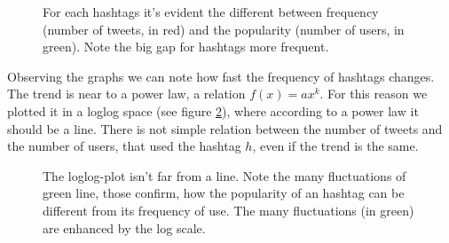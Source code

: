 \documentclass[a4paper,11pt,oneside]{article}
\begin{document}
\begin{figure}[h]
\centering
{}
\caption{For each hashtags it's evident the different between frequency (number of tweets, in red) and the popularity (number of users, in green). Note the big gap for hashtags more frequent.}
\label{fig:plotFrequency}
\end{figure}

Observing the graphs we can note how fast the frequency of hashtags changes. The trend is near to a power law, a relation $f(x) = ax^k$. For this reason we plotted it in a loglog space (see figure \ref{fig:loglogPlot}), where according to a power law it should be a line.
There is not simple relation between the number of tweets and the number of users, that used the hashtag $h$, even if the trend is the same.

\begin{figure}[h]
\centering
{}
\caption{The loglog-plot isn't far from a line. Note the many fluctuations of green line, those confirm, how the popularity of an hashtag can be different from its frequency of use. The many fluctuations (in green) are enhanced by the log scale.}
\label{fig:loglogPlot}
\end{figure}
\end{document}
